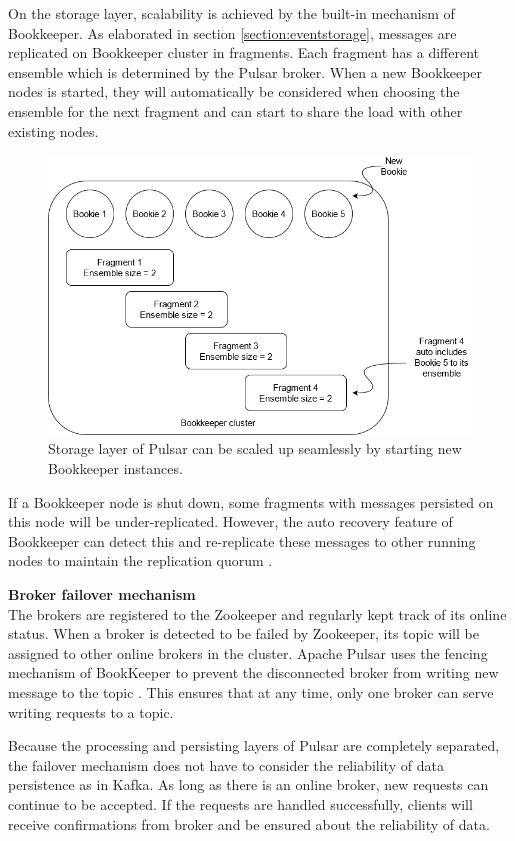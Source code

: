 On the storage layer, scalability is achieved by the built-in mechanism of Bookkeeper. As elaborated in section \ref{section:eventstorage}, messages are replicated on Bookkeeper cluster in fragments. Each fragment has a different ensemble which is determined by the Pulsar broker. When a new Bookkeeper nodes is started, they will automatically be considered when choosing the ensemble for the next fragment and can start to share the load with other existing nodes. 
\begin{figure}[h]
	\centering
	\includegraphics[width=\linewidth]{images/scalability-pulsar.png}
	\caption{Storage layer of Pulsar can be scaled up seamlessly by starting new Bookkeeper instances.}
	\label{fig:scalabilitypulsar}
\end{figure}

If a Bookkeeper node is shut down, some fragments with messages persisted on this node will be under-replicated. However, the auto recovery feature of Bookkeeper can detect this and re-replicate these messages to other running nodes to maintain the replication quorum \cite{bookkeeperadmin}.

\textbf{Broker failover mechanism}\\
The brokers are registered to the Zookeeper and regularly kept track of its online status. When a broker is detected to be failed by Zookeeper, its topic will be assigned to other online brokers in the cluster. Apache Pulsar uses the fencing mechanism of BookKeeper to prevent the disconnected broker from writing new message to the topic \cite{bookkeeperprotocol}. This ensures that at any time, only one broker can serve writing requests to a topic.

Because the processing and persisting layers of Pulsar are completely separated, the failover mechanism does not have to consider the reliability of data persistence as in Kafka. As long as there is an online broker, new requests can continue to be accepted. If the requests are handled successfully, clients will receive confirmations from broker and be ensured about the reliability of data. 

